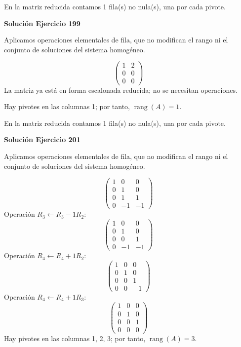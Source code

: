 \documentclass[12pt]{article}
\newcommand{\rang}{\operatorname{rang}}
\begin{document}
En la matriz reducida contamos 1 fila(s) no nula(s), una por cada pivote.


\par\bigskip\noindent\textbf{Solución Ejercicio 199}\par\nobreak
Aplicamos operaciones elementales de fila, que no modifican el rango ni el conjunto de soluciones del sistema homogéneo.

\[
\begin{pmatrix}1&2\\0&0\\0&0\end{pmatrix}
\]
La matriz ya está en forma escalonada reducida; no se necesitan operaciones.

Hay pivotes en las columnas 1; por tanto, $\boxed{\rang(A)=1}$.

En la matriz reducida contamos 1 fila(s) no nula(s), una por cada pivote.


\par\bigskip\noindent\textbf{Solución Ejercicio 201}\par\nobreak
Aplicamos operaciones elementales de fila, que no modifican el rango ni el conjunto de soluciones del sistema homogéneo.

\[
\begin{pmatrix}1&0&0\\0&1&0\\0&1&1\\0&-1&-1\end{pmatrix}
\]
Operación $R_{3}\leftarrow R_{3}-1R_{2}$:
\[
\begin{pmatrix}1&0&0\\0&1&0\\0&0&1\\0&-1&-1\end{pmatrix}
\]
Operación $R_{4}\leftarrow R_{4}+1R_{2}$:
\[
\begin{pmatrix}1&0&0\\0&1&0\\0&0&1\\0&0&-1\end{pmatrix}
\]
Operación $R_{4}\leftarrow R_{4}+1R_{3}$:
\[
\begin{pmatrix}1&0&0\\0&1&0\\0&0&1\\0&0&0\end{pmatrix}
\]
Hay pivotes en las columnas 1, 2, 3; por tanto, $\boxed{\rang(A)=3}$.
\end{document}
